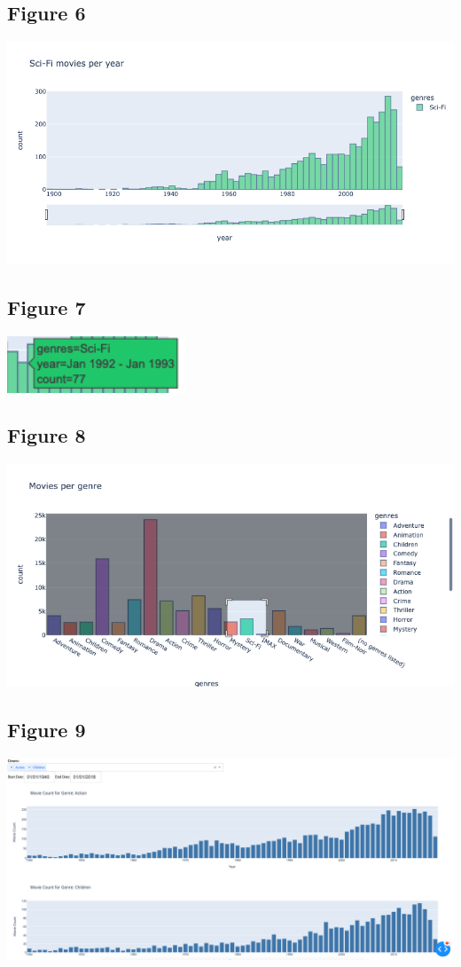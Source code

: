 \documentclass{article}
\begin{document}
\subsection{Figure 6}
\includegraphics[width=1\textwidth]{img/movies-scifi.png}

\subsection{Figure 7}
\includegraphics[width=0.4\textwidth]{img/tooltip.png}

\subsection{Figure 8}
\includegraphics[width=1\textwidth]{img/brushing.png}

\subsection{Figure 9}
\includegraphics[width=1\textwidth]{img/dashboard_plotly.png}
\end{document}

